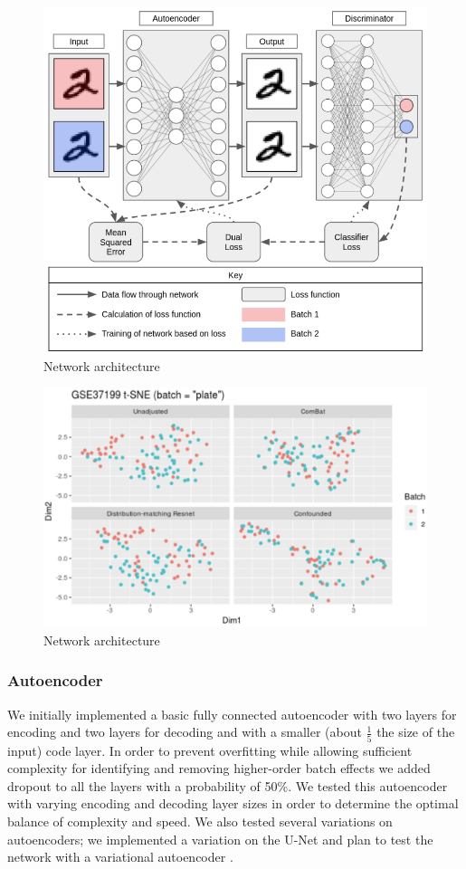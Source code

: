\documentclass[notitlepage]{article}
\begin{document}
\begin{figure}
	\centering
	\includegraphics[width=4.5in]{figures/rough/network}
	\caption{Network architecture}
	\label{simulationfigure}
\end{figure}
\begin{figure}
	\centering
	\includegraphics[width=4.5in]{figures/rough/tsne}
	\caption{Network architecture}
	\label{simulationfigure}
\end{figure}

\subsubsection{Autoencoder}

We initially implemented a basic fully connected autoencoder with two layers for encoding and two layers for decoding and with a smaller (about $\frac{1}{5}$ the size of the input) code layer.
In order to prevent overfitting while allowing sufficient complexity for identifying and removing higher-order batch effects we added dropout to all the layers with a probability of 50\%.
We tested this autoencoder with varying encoding and decoding layer sizes in order to determine the optimal balance of complexity and speed.
We also tested several variations on autoencoders; we implemented a variation on the U-Net \cite{ronneberger_u-net_2015} and plan to test the network with a variational autoencoder \cite{kingma_auto-encoding_2013}.
\end{document}
